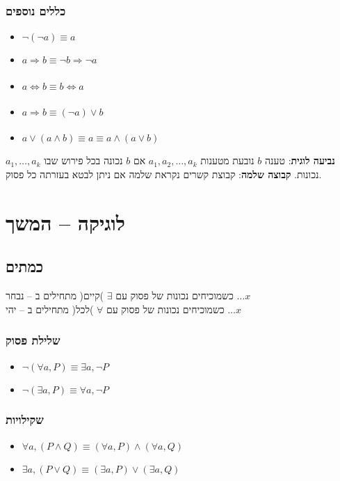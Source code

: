 \documentclass[11pt, oneside]{article}
\newcommand{\opr}[1]{\underset{\text{#1}}{\Rightarrow}}
\newcommand{\bidiarrow}[1]{\underset{\text{#1}}{\Leftrightarrow}}
\newcommand{\definition}[2]{\textbf{#1}: #2.}
\begin{document}
\subsubsection*{כללים נוספים}
\begin{itemize}
\item $\neg (\neg a) \equiv a$
\item $a \opr{} b \equiv \neg b \opr{} \neg a$
\item $a \bidiarrow{} b \equiv b \bidiarrow{} a$
\item $a \opr{} b \equiv (\neg a) \lor b$
\item $a \lor (a \land b) \equiv a \equiv a \land (a \lor b)$
\end{itemize}
\bigskip

\definition{נביעה לוגית}{טענה $b$ נובעת מטענות $a_{1}, a_{2}, \dots , a_{k}$ אם $b$ נכונה בכל פירוש שבו $a_{1}, \dots, a_{k}$ נכונות}
\definition{קבוצה שלמה}{קבוצת קשרים נקראת שלמה אם ניתן לבטא בעזרתה כל פסוק}
\clearpage

\section*{לוגיקה -- המשך}
\subsection*{כמתים}
כשמוכיחים נכונות של פסוק עם $\exists$ )קיים( מתחילים ב -- נבחר $\dots x$\\
כשמוכיחים נכונות של פסוק עם $\forall$ )לכל( מתחילים ב -- יהי $\dots x$
\subsubsection*{שלילת פסוק}
\begin{itemize}
\item $\neg (\forall a, P) \equiv \exists a, \neg P$
\item $\neg (\exists a, P) \equiv \forall a, \neg P$
\end{itemize}

\subsubsection*{שקילויות}
\begin{itemize}
\item $\forall a, (P \land Q) \equiv (\forall a, P) \land (\forall a, Q)$
\item $\exists a, (P \lor Q) \equiv (\exists a, P) \lor (\exists a, Q)$
\end{itemize}
\end{document}
